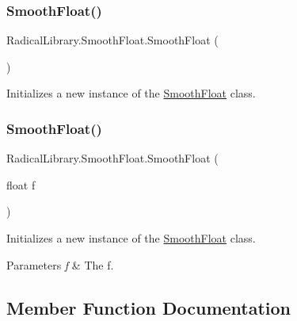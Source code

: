 \subsubsection{\texorpdfstring{Smooth\+Float()}{SmoothFloat()}\hspace{0.1cm}{\footnotesize\ttfamily [1/2]}}
{\footnotesize\ttfamily Radical\+Library.\+Smooth\+Float.\+Smooth\+Float (\begin{DoxyParamCaption}{ }\end{DoxyParamCaption})\hspace{0.3cm}{\ttfamily [inline]}}



Initializes a new instance of the \hyperlink{class_radical_library_1_1_smooth_float}{Smooth\+Float} class. 

\mbox{\label{class_radical_library_1_1_smooth_float_a982a3005f927fe86a7d032bfd794a15c}} 
\subsubsection{\texorpdfstring{Smooth\+Float()}{SmoothFloat()}\hspace{0.1cm}{\footnotesize\ttfamily [2/2]}}
{\footnotesize\ttfamily Radical\+Library.\+Smooth\+Float.\+Smooth\+Float (\begin{DoxyParamCaption}\item[{float}]{f }\end{DoxyParamCaption})\hspace{0.3cm}{\ttfamily [inline]}}



Initializes a new instance of the \hyperlink{class_radical_library_1_1_smooth_float}{Smooth\+Float} class. 


\begin{DoxyParams}{Parameters}
{\em f} & The f.\\
\hline
\end{DoxyParams}


\subsection{Member Function Documentation}
\mbox{\label{class_radical_library_1_1_smooth_float_a468aab25d1723a1022bf25a9c55796f7}} 
